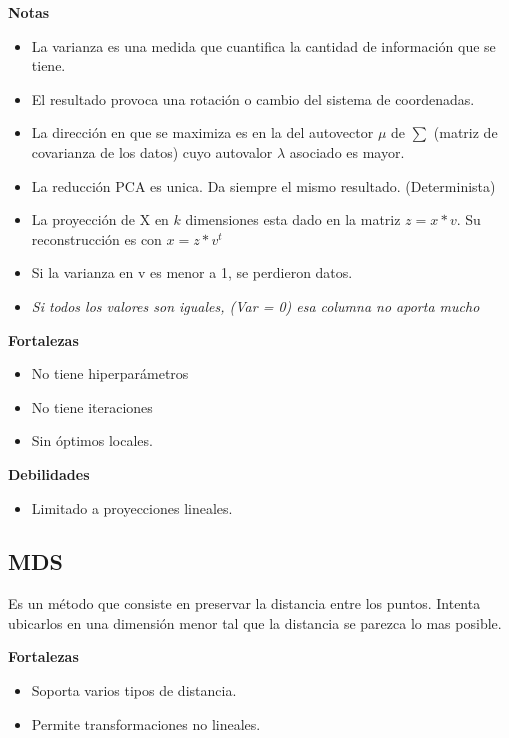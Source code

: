 \documentclass[titlepage,a4paper]{article}
\begin{document}
\textbf{Notas}
\begin{itemize}

\item La varianza es una medida que cuantifica la cantidad de información que se tiene.

\item El resultado provoca una rotación o cambio del sistema de coordenadas.

\item La dirección en que se maximiza es en la del autovector $\mu$ de $\sum$ (matriz de covarianza de los datos) cuyo autovalor $\lambda$ asociado es mayor.

\item La reducción PCA es unica. Da siempre el mismo resultado. (Determinista)

\item La proyección de X en $k$ dimensiones esta dado en la matriz $z = x * v$. Su reconstrucción es con $x = z * v^{t}$

\item Si la varianza en v es menor a 1, se perdieron datos.

\item \textit{Si todos los valores son iguales, (Var = 0) esa columna no aporta mucho}

\end{itemize}

\textbf{Fortalezas}
\begin{itemize}
    \item No tiene hiperparámetros
    \item No tiene iteraciones
    \item Sin óptimos locales.
\end{itemize}

\textbf{Debilidades}
\begin{itemize}
    \item Limitado a proyecciones lineales.
\end{itemize}


\subsection{MDS}

Es un método que consiste en preservar la distancia entre los puntos. Intenta ubicarlos en una dimensión menor tal que la distancia se parezca lo mas posible.

\textbf{Fortalezas}
\begin{itemize}
    \item Soporta varios tipos de distancia.
    \item Permite transformaciones no lineales.
\end{itemize}
\end{document}
